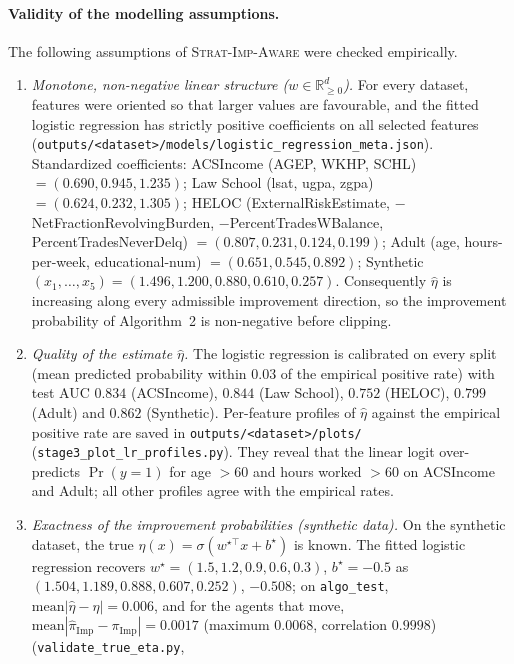 \paragraph{Validity of the modelling assumptions.}
The following assumptions of \textsc{Strat-Imp-Aware} were checked empirically.
\begin{enumerate}
  \item \emph{Monotone, non-negative linear structure ($w\in\mathbb{R}^d_{\ge 0}$).}
  For every dataset, features were oriented so that larger values are
  favourable, and the fitted logistic regression has strictly positive
  coefficients on all selected features
  (\texttt{outputs/<dataset>/models/logistic\_regression\_meta.json}).
  Standardized coefficients: ACSIncome (AGEP, WKHP, SCHL) $=(0.690, 0.945, 1.235)$;
  Law School (lsat, ugpa, zgpa) $=(0.624, 0.232, 1.305)$;
  HELOC (ExternalRiskEstimate, $-$NetFractionRevolvingBurden,
  $-$PercentTradesWBalance, PercentTradesNeverDelq) $=(0.807, 0.231, 0.124, 0.199)$;
  Adult (age, hours-per-week, educational-num) $=(0.651, 0.545, 0.892)$;
  Synthetic $(x_1,\dots,x_5)=(1.496, 1.200, 0.880, 0.610, 0.257)$.
  Consequently $\widehat{\eta}$ is increasing along every admissible
  improvement direction, so the improvement probability of Algorithm~2 is
  non-negative before clipping.
  \item \emph{Quality of the estimate $\widehat{\eta}$.}
  The logistic regression is calibrated on every split (mean predicted
  probability within $0.03$ of the empirical positive rate) with test AUC
  $0.834$ (ACSIncome), $0.844$ (Law School), $0.752$ (HELOC), $0.799$ (Adult)
  and $0.862$ (Synthetic). Per-feature profiles of $\widehat{\eta}$ against the
  empirical positive rate are saved in \texttt{outputs/<dataset>/plots/}
  (\texttt{stage3\_plot\_lr\_profiles.py}). They reveal that the linear logit
  over-predicts $\Pr(y{=}1)$ for age $>60$ and hours worked $>60$ on ACSIncome and
  Adult; all other profiles agree with the empirical rates.
  \item \emph{Exactness of the improvement probabilities (synthetic data).}
  On the synthetic dataset, the true $\eta(x)=\sigma(w^{\star\top}x+b^{\star})$
  is known. The fitted logistic regression recovers
  $w^\star=(1.5,1.2,0.9,0.6,0.3)$, $b^\star=-0.5$ as
  $(1.504, 1.189, 0.888, 0.607, 0.252)$, $-0.508$; on \texttt{algo\_test},
  $\mathrm{mean}|\widehat{\eta}-\eta|=0.006$, and for the agents that move,
  $\mathrm{mean}|\widehat{\pi}_{\mathrm{Imp}}-\pi_{\mathrm{Imp}}|=0.0017$
  (maximum $0.0068$, correlation $0.9998$)
  (\texttt{validate\_true\_eta.py},

\end{enumerate}

